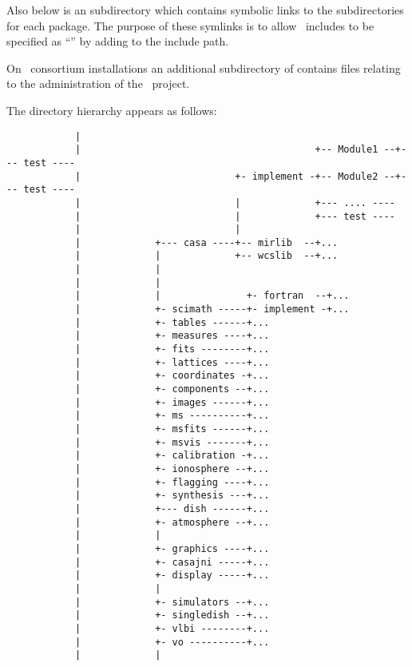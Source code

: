 Also below  is an  subdirectory which
contains symbolic links to the  subdirectories for each
package.  The purpose of these symlinks is to allow \casa\ includes to be
specified as ``'' by adding
\mbox{} to the include path.

On \casa\ consortium installations an additional  subdirectory
of  contains files relating to the administration of the
\casa\ project.

The  directory hierarchy appears as follows:

\begin{verbatim}
            |                            
            |                                         +-- Module1 --+--- test ----
            |                           +- implement -+-- Module2 --+--- test ----
            |                           |             +--- .... ----
            |                           |             +--- test ----
            |                           |
            |             +--- casa ----+-- mirlib  --+...
            |             |             +-- wcslib  --+...
            |             |             
            |             |
            |             |               +- fortran  --+...
            |             +- scimath -----+- implement -+...
            |             +- tables ------+...
            |             +- measures ----+...
            |             +- fits --------+...
            |             +- lattices ----+...
            |             +- coordinates -+...
            |             +- components --+...
            |             +- images ------+...
            |             +- ms ----------+...
            |             +- msfits ------+...
            |             +- msvis -------+...
            |             +- calibration -+...
            |             +- ionosphere --+...
            |             +- flagging ----+...
            |             +- synthesis ---+...
            |             +--- dish ------+...
            |             +- atmosphere --+...
            |             |
            |             +- graphics ----+...
            |             +- casajni -----+...
            |             +- display -----+...
            |             |
            |             +- simulators --+...
            |             +- singledish --+...
            |             +- vlbi --------+...
            |             +- vo ----------+...
            |             |

\end{verbatim}
